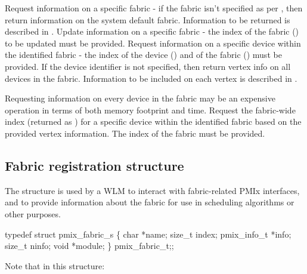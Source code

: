 \begin{constantdesc}
%
Request information on a specific fabric - if the fabric isn't specified as per , then return information on the system default fabric. Information to be returned is described in .
%
Update information on a specific fabric - the index of the fabric () to be updated must be provided.
%
Request information on a specific device within the identified fabric - the index of the device () and of the fabric () must be provided. If the device identifier is not specified, then return vertex info on all devices in the fabric. Information to be included on each vertex is described in .

\adviceuserstart
Requesting information on every device in the fabric may be an expensive operation in terms of both memory footprint and time.
\adviceuserend
%
Request the fabric-wide index (returned as ) for a specific device within the identified fabric based on the provided vertex information. The index of the fabric must be provided.
%
\end{constantdesc}


\subsection{Fabric registration structure}

The  structure is used by a \ac{WLM} to interact with fabric-related \ac{PMIx} interfaces, and to provide information about the fabric for use in scheduling algorithms or other purposes.

\cspecificstart
\begin{codepar}
typedef struct pmix_fabric_s \{
    char *name;
    size_t index;
    pmix_info_t *info;
    size_t ninfo;
    void *module;
\} pmix_fabric_t;;
\end{codepar}
\cspecificend

Note that in this structure:


